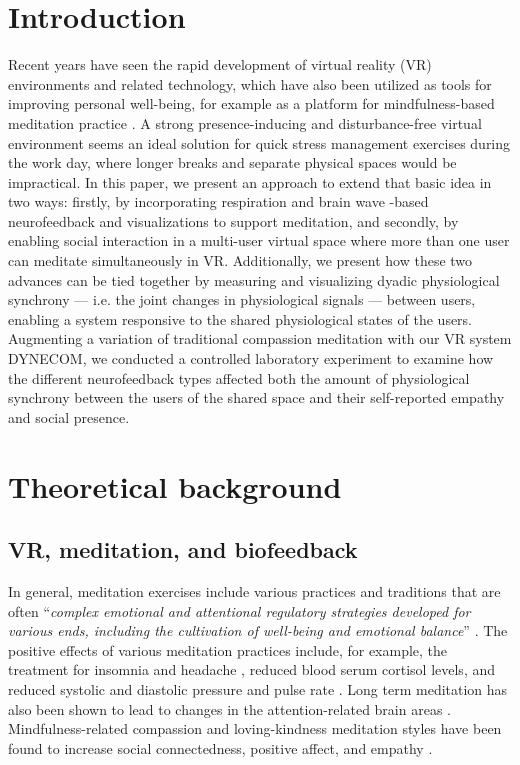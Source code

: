 \documentclass[manuscript, review = false, screen]{acmart}
\begin{document}
%
\maketitle

\section{Introduction}
Recent years have seen the rapid development of virtual reality (VR) environments and related technology, which have also been utilized as tools for improving personal well-being, for example as a platform for mindfulness-based meditation practice \cite{Shaw2007,Gromala2015,Kosunen2016}. A strong presence-inducing and disturbance-free virtual environment \cite{Coelho2006,Schuemie2004,Welch1996} seems an ideal solution for quick stress management exercises during the work day, where longer breaks and separate physical spaces would be impractical. In this paper, we present an approach to extend that basic idea in two ways: firstly, by incorporating respiration and brain wave -based neurofeedback and visualizations to support meditation, and secondly, by enabling social interaction in a multi-user virtual space where more than one user can meditate simultaneously in VR. Additionally, we present how these two advances can be tied together by measuring and visualizing dyadic physiological synchrony --- i.e. the joint changes in physiological signals ---  between users, enabling a system responsive to the shared physiological states of the users. Augmenting a variation of traditional compassion meditation with our VR system DYNECOM, we conducted a controlled laboratory experiment to examine how the different neurofeedback types affected both the amount of physiological synchrony between the users of the shared space and their self-reported empathy and social presence.


\section{Theoretical background}
\subsection{VR, meditation, and biofeedback}
In general, meditation exercises include various practices and traditions that are often ``\textit{complex emotional and attentional regulatory strategies developed for various ends, including the cultivation of well-being and emotional balance}'' \cite{Lutz2008a}. The positive effects of various meditation practices include, for example, the treatment for insomnia \cite{Woolfolk1976} and headache \cite{BENSON1974}, reduced blood serum cortisol levels, and reduced systolic and diastolic pressure and pulse rate \cite{Sudsuang1991}. Long term meditation has also been shown to lead to changes in the attention-related brain areas \cite{Chiesa2010}. Mindfulness-related compassion and loving-kindness meditation styles have been found to increase social connectedness, positive affect, and empathy \cite{Hutcherson2008,Hofmann2011}.
\end{document}
